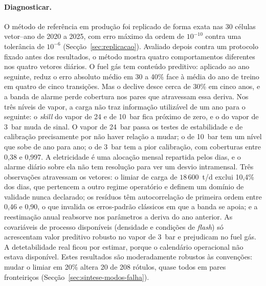 \paragraph{Diagnosticar.} O método de referência em produção foi replicado
de forma exata nas 30 células vetor--ano de 2020 a 2025, com erro máximo da
ordem de $10^{-10}$ contra uma tolerância de $10^{-6}$
(Secção~\ref{sec:replicacao}). Avaliado depois contra um protocolo fixado
antes dos resultados, o método mostra quatro comportamentos diferentes nos
quatro vetores diários. O fuel gás tem conteúdo preditivo: aplicado ao ano
seguinte, reduz o erro absoluto médio em 30 a 40\% face à média do ano de
treino em quatro de cinco transições. Mas o declive desce cerca de 30\% em
cinco anos, e a banda de alarme perde cobertura nos pares que atravessam
essa deriva. Nos três níveis de vapor, a carga não traz informação
utilizável de um ano para o seguinte: o \emph{skill} do vapor de 24 e de
10~bar fica próximo de zero, e o do vapor de 3~bar muda de sinal. O vapor de
24~bar passa os testes de estabilidade e de calibração precisamente por não
haver relação a mudar; o de 10~bar tem um nível que sobe de ano para ano; o
de 3~bar tem a pior calibração, com coberturas entre 0,38 e 0,997. A
eletricidade é uma alocação mensal repartida pelos dias, e o alarme diário
sobre ela não tem resolução para ver um desvio intramensal. Três observações
atravessam os vetores: o limiar de carga de $18\,600$~t/d exclui 10,4\% dos
dias, que pertencem a outro regime operatório e definem um domínio de
validade nunca declarado; os resíduos têm autocorrelação de primeira ordem
entre 0,46 e 0,90, o que invalida os erros-padrão clássicos em que a banda
se apoia; e a reestimação anual reabsorve nos parâmetros a deriva do ano
anterior. As covariáveis de processo disponíveis (densidade e condições de
\emph{flash}) só acrescentam valor preditivo robusto no vapor de 3~bar e
prejudicam no fuel gás. A detetabilidade real ficou por estimar, porque o
calendário operacional não estava disponível. Estes resultados são
moderadamente robustos às convenções: mudar o limiar em 20\% altera 20 de
208 rótulos, quase todos em pares fronteiriços
(Secção~\ref{sec:sintese-modos-falha}).

